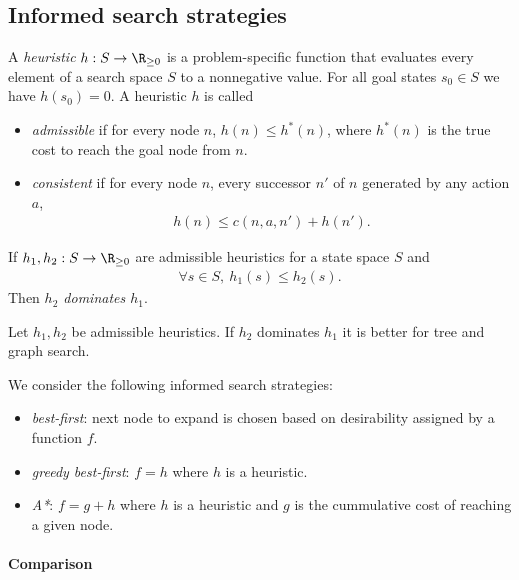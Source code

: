 \documentclass{article}
\begin{document}
\subsection{Informed search strategies}

\begin{definition}
    A \emph{heuristic} $h:S\to \R_{\geq 0}$ is a problem-specific function
    that evaluates every element of a search space $S$ to a nonnegative value.
    For all goal states $s_0\in S$ we have $h(s_0)=0$.
    A heuristic $h$ is called
    \begin{itemize}
        \item \emph{admissible} if for every node $n$, $h(n)\leq h^*(n)$,
        where $h^*(n)$ is the true cost to reach the goal node from $n$.
        \item \emph{consistent} if for every node $n$, every
        successor $n'$ of $n$ generated by any action $a$,
        \begin{align*}
            h(n) \leq c(n, a, n') + h(n').
        \end{align*}
    \end{itemize}
    If $h_1,h_2:S\to \R_{\geq 0}$ are admissible heuristics for a state
    space $S$ and
    \begin{align*}
        \forall s\in S,\: h_1(s) \leq h_2(s).
    \end{align*}
    Then \emph{$h_2$ dominates $h_1$}.
\end{definition}

\begin{theorem}
    Let $h_1,h_2$ be admissible heuristics. If $h_2$ dominates $h_1$ it is
    better for tree and graph search.
\end{theorem}

\begin{definition}
    We consider the following informed search strategies:
    \begin{itemize}
        \item \emph{best-first}: next node to expand is chosen based on desirability assigned by a function $f$.
        \item \emph{greedy best-first}: $f=h$ where $h$ is a heuristic.
        \item \emph{A*}: $f=g+h$ where $h$ is a heuristic and $g$ is the cummulative cost of reaching a given node.
    \end{itemize}
\end{definition}

\paragraph{Comparison}
\end{document}
